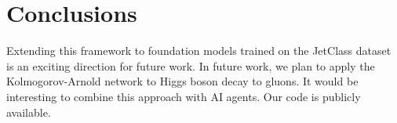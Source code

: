\section{Conclusions}\label{sec:conclusions}

Extending this framework to foundation models trained on the JetClass
dataset is an exciting direction for future work. In future work, we
plan to apply the Kolmogorov-Arnold network to Higgs boson decay to
gluons. It would be interesting to combine this approach with AI agents.
Our code is publicly available.

